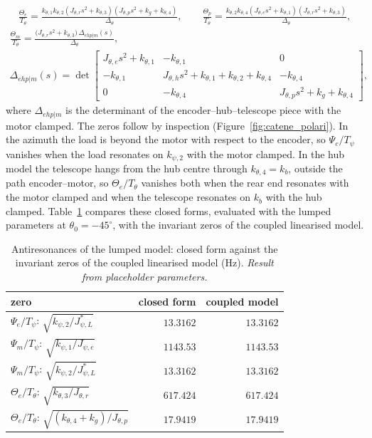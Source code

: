 \documentclass[10pt,a4paper]{article}
\numberwithin{equation}{section}
\begin{document}
\begin{gather}
\frac{\Theta_e}{T_\theta} = \frac{k_{\theta,1} k_{\theta,2} \left(J_{\theta,r} s^{2} + k_{\theta,3}\right) \left(J_{\theta,p} s^{2} + k_{g} + k_{\theta,4}\right)}{\Delta_\theta},\qquad \frac{\Theta_p}{T_\theta} = \frac{k_{\theta,2} k_{\theta,4} \left(J_{\theta,e} s^{2} + k_{\theta,1}\right) \left(J_{\theta,r} s^{2} + k_{\theta,3}\right)}{\Delta_\theta},
\end{gather}
\begin{gather}
\frac{\Theta_m}{T_\theta} = \frac{\bigl(J_{\theta,r}s^2 + k_{\theta,3}\bigr)\,\Delta_{ehp|m}(s)}{\Delta_\theta}, \\ \Delta_{ehp|m}(s) = \det\left[\begin{matrix}J_{\theta,e} s^{2} + k_{\theta,1} & - k_{\theta,1} & 0\\- k_{\theta,1} & J_{\theta,h} s^{2} + k_{\theta,1} + k_{\theta,2} + k_{\theta,4} & - k_{\theta,4}\\0 & - k_{\theta,4} & J_{\theta,p} s^{2} + k_{g} + k_{\theta,4}\end{matrix}\right],
\end{gather}
where $\Delta_{ehp|m}$ is the determinant of the encoder--hub--telescope piece with the motor clamped.
The zeros follow by inspection (Figure~\ref{fig:catene_polari}). In the azimuth the load is beyond the motor with respect to the encoder, so $\Psi_e/T_\psi$ vanishes when the load resonates on $k_{\psi,2}$ with the motor clamped. In the hub model the telescope hangs from the hub centre through $k_{\theta,4} = k_b$, outside the path encoder--motor, so $\Theta_e/T_\theta$ vanishes both when the rear end resonates with the motor clamped and when the telescope resonates on $k_b$ with the hub clamped. Table~\ref{tab:lump_zeros} compares these closed forms, evaluated with the lumped parameters at $\theta_0 = -45^\circ$, with the invariant zeros of the coupled linearised model.
\begin{table}[H]\centering\small
\caption{Antiresonances of the lumped model: closed form against the invariant zeros of the coupled linearised model (Hz). \emph{Result from placeholder parameters.}}\label{tab:lump_zeros}
\begin{tabular}{lrr}\toprule
zero & closed form & coupled model \\ \midrule
$\Psi_e/T_\psi$: $\sqrt{k_{\psi,2}/J_{\psi,L}^*}$ & $13.3162$ & $13.3162$ \\
$\Psi_m/T_\psi$: $\sqrt{k_{\psi,1}/J_{\psi,e}}$ & $1143.53$ & $1143.53$ \\
$\Psi_m/T_\psi$: $\sqrt{k_{\psi,2}/J_{\psi,L}^*}$ & $13.3162$ & $13.3162$ \\
$\Theta_e/T_\theta$: $\sqrt{k_{\theta,3}/J_{\theta,r}}$ & $617.424$ & $617.424$ \\
$\Theta_e/T_\theta$: $\sqrt{(k_{\theta,4} + k_g)/J_{\theta,p}}$ & $17.9419$ & $17.9419$ \\
\bottomrule\end{tabular}\end{table}
\end{document}

